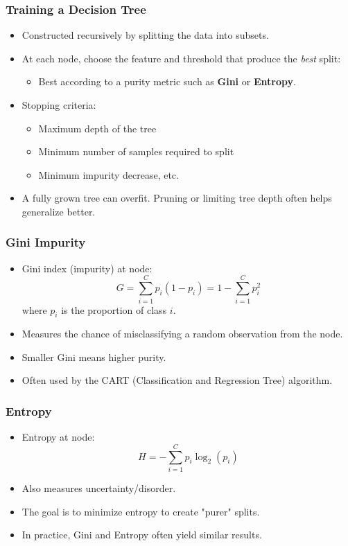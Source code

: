 \documentclass[aspectratio=169]{beamer}
\begin{document}
\begin{frame}
    \frametitle{Training a Decision Tree}
    \begin{itemize}
        \item Constructed recursively by splitting the data into subsets.
        \item At each node, choose the feature and threshold that produce the \emph{best} split:
        \begin{itemize}
            \item Best according to a purity metric such as \textbf{Gini} or \textbf{Entropy}.
        \end{itemize}
        \item Stopping criteria:
        \begin{itemize}
            \item Maximum depth of the tree
            \item Minimum number of samples required to split
            \item Minimum impurity decrease, etc.
        \end{itemize}
        \item A fully grown tree can overfit. Pruning or limiting tree depth often helps generalize better.
    \end{itemize}
\end{frame}

\begin{frame}
    \frametitle{Gini Impurity}
    \begin{itemize}
        \item Gini index (impurity) at node:
        \[
            G = \sum_{i=1}^{C} p_i(1 - p_i) = 1 - \sum_{i=1}^C p_i^2
        \]
        where \(p_i\) is the proportion of class \(i\).
        \item Measures the chance of misclassifying a random observation from the node.
        \item Smaller Gini means higher purity.
        \item Often used by the CART (Classification and Regression Tree) algorithm.
    \end{itemize}
\end{frame}

\begin{frame}
    \frametitle{Entropy}
    \begin{itemize}
        \item Entropy at node:
        \[
            H = -\sum_{i=1}^C p_i \log_2(p_i)
        \]
        \item Also measures uncertainty/disorder.
        \item The goal is to minimize entropy to create "purer" splits.
        \item In practice, Gini and Entropy often yield similar results.
    \end{itemize}
\end{frame}
\end{document}
